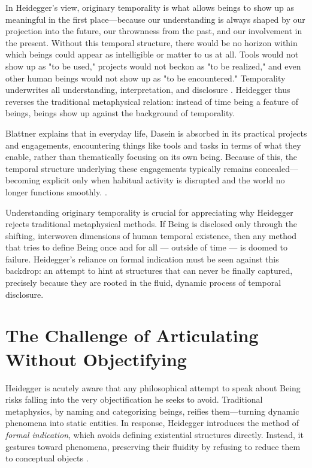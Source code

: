 \documentclass{article}
\begin{document}
In Heidegger’s view, originary temporality is what allows beings to show up as meaningful in the first place—because our understanding is always shaped by our projection into the future, our thrownness from the past, and our involvement in the present. Without this temporal structure, there would be no horizon within which beings could appear as intelligible or matter to us at all. Tools would not show up as "to be used," projects would not beckon as "to be realized," and even other human beings would not show up as "to be encountered." Temporality underwrites all understanding, interpretation, and disclosure \parencite[pp.~645--650]{heidegger1962}. Heidegger thus reverses the traditional metaphysical relation: instead of time being a feature of beings, beings show up against the background of temporality.

Blattner explains that in everyday life, Dasein is absorbed in its practical projects and engagements, encountering things like tools and tasks in terms of what they enable, rather than thematically focusing on its own being. Because of this, the temporal structure underlying these engagements typically remains concealed—becoming explicit only when habitual activity is disrupted and the world no longer functions smoothly. \parencite[p.~314]{blattner2007}.

Understanding originary temporality is crucial for appreciating why Heidegger rejects traditional metaphysical methods. If Being is disclosed only through the shifting, interwoven dimensions of human temporal existence, then any method that tries to define Being once and for all --- outside of time --- is doomed to failure. Heidegger's reliance on formal indication must be seen against this backdrop: an attempt to hint at structures that can never be finally captured, precisely because they are rooted in the fluid, dynamic process of temporal disclosure.

\section*{The Challenge of Articulating \\ Without Objectifying}

Heidegger is acutely aware that any philosophical attempt to speak about Being risks falling into the very objectification he seeks to avoid. Traditional metaphysics, by naming and categorizing beings, reifies them—turning dynamic phenomena into static entities. In response, Heidegger introduces the method of \textit{formal indication}, which avoids defining existential structures directly. Instead, it gestures toward phenomena, preserving their fluidity by refusing to reduce them to conceptual objects \parencite[pp.~781–784]{dahlstrom1994}.
\end{document}
